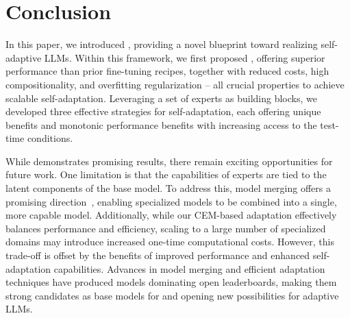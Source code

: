 \vspace{-1mm}
\section{Conclusion}
\label{sec:conclusion}
\vspace{-3mm}

In this paper, we introduced \implname, providing a novel blueprint toward realizing self-adaptive LLMs.
Within this framework, we first proposed \svdacro, offering superior performance than prior fine-tuning recipes, together with reduced costs, high compositionality, and overfitting regularization -- all crucial properties to achieve scalable self-adaptation.
Leveraging a set of \svdacro experts as building blocks, we developed three effective strategies for self-adaptation, each offering unique benefits and monotonic performance benefits with increasing access to the test-time conditions.

While \implname demonstrates promising results, there remain exciting opportunities for future work.
One limitation is that the capabilities of \svdacro experts are tied to the latent components of the base model.
To address this, model merging offers a promising direction~\citep{yu2024language,goddard2024arcee,akiba2024evolutionary}, enabling specialized models to be combined into a single, more capable model.
Additionally, while our CEM-based adaptation effectively balances performance and efficiency, scaling to a large number of specialized domains may introduce increased one-time computational costs.
However, this trade-off is offset by the benefits of improved performance and enhanced self-adaptation capabilities.
Advances in model merging and efficient adaptation techniques have produced models dominating open leaderboards, making them strong candidates as base models for \implname and opening new possibilities for adaptive LLMs.
